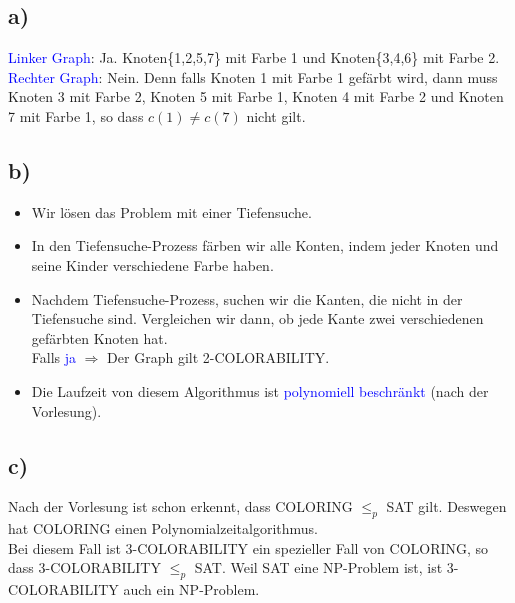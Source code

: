\documentclass[a4paper,11pt]{scrartcl}
\begin{document}
\subsection*{a)}
\noindent \textcolor{blue}{Linker Graph}: Ja. Knoten\{1,2,5,7\} mit Farbe 1 und Knoten\{3,4,6\} mit Farbe 2.\\
\textcolor{blue}{Rechter Graph}: Nein. Denn falls Knoten 1 mit Farbe 1 gefärbt wird, dann muss Knoten 3 mit Farbe 2, Knoten 5 mit Farbe 1, Knoten 4 mit Farbe 2 und Knoten 7 mit Farbe 1, so dass $c(1)\ne c(7)$ nicht gilt.

\subsection*{b)}
\begin{itemize}
	\item Wir lösen das Problem mit einer Tiefensuche.
	\item In den Tiefensuche-Prozess färben wir alle Konten, indem jeder Knoten und seine Kinder verschiedene Farbe haben.
	\item Nachdem Tiefensuche-Prozess, suchen wir die Kanten, die nicht in der Tiefensuche sind. Vergleichen wir dann, ob jede Kante zwei verschiedenen gefärbten Knoten hat.\\
	Falls \textcolor{blue}{ja} $\Rightarrow$ Der Graph gilt 2-COLORABILITY.
	\item Die Laufzeit  von diesem Algorithmus ist \textcolor{blue}{polynomiell beschränkt} (nach der Vorlesung).
\end{itemize}

\subsection*{c)}
\noindent Nach der Vorlesung ist schon erkennt, dass COLORING $\leq_p$ SAT gilt. Deswegen hat COLORING einen Polynomialzeitalgorithmus.\\
Bei diesem Fall ist 3-COLORABILITY ein spezieller Fall von COLORING, so dass 3-COLORABILITY $\leq_p$ SAT. Weil SAT eine NP-Problem ist, ist 3-COLORABILITY auch ein NP-Problem.
\end{document}
